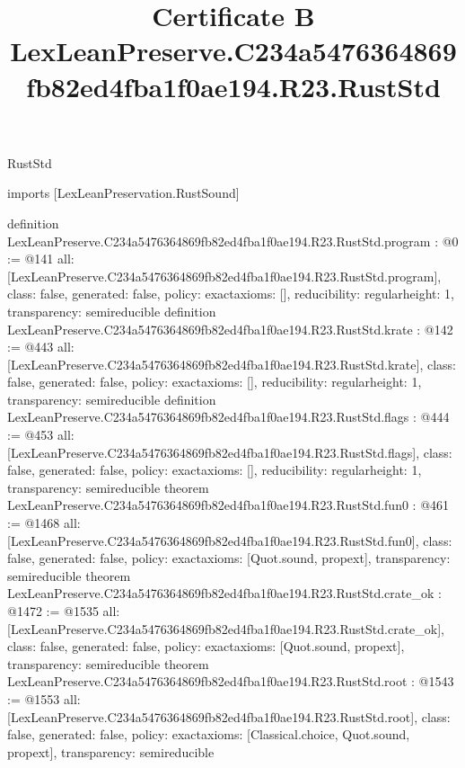 \begin{lexlean}{RustStd}
\title{Certificate B LexLeanPreserve.C234a5476364869fb82ed4fba1f0ae194.R23.RustStd}
\begin{coremodule}
imports [LexLeanPreservation.RustSound]

definition LexLeanPreserve.C234a5476364869fb82ed4fba1f0ae194.R23.RustStd.program : @0 := @141 {
  all: [LexLeanPreserve.C234a5476364869fb82ed4fba1f0ae194.R23.RustStd.program],
  class: false,
  generated: false,
  policy: exact{axioms: []},
  reducibility: regular{height: 1},
  transparency: semireducible
}
definition LexLeanPreserve.C234a5476364869fb82ed4fba1f0ae194.R23.RustStd.krate : @142 := @443 {
  all: [LexLeanPreserve.C234a5476364869fb82ed4fba1f0ae194.R23.RustStd.krate],
  class: false,
  generated: false,
  policy: exact{axioms: []},
  reducibility: regular{height: 1},
  transparency: semireducible
}
definition LexLeanPreserve.C234a5476364869fb82ed4fba1f0ae194.R23.RustStd.flags : @444 := @453 {
  all: [LexLeanPreserve.C234a5476364869fb82ed4fba1f0ae194.R23.RustStd.flags],
  class: false,
  generated: false,
  policy: exact{axioms: []},
  reducibility: regular{height: 1},
  transparency: semireducible
}
theorem LexLeanPreserve.C234a5476364869fb82ed4fba1f0ae194.R23.RustStd.fun0 : @461 := @1468 {
  all: [LexLeanPreserve.C234a5476364869fb82ed4fba1f0ae194.R23.RustStd.fun0],
  class: false,
  generated: false,
  policy: exact{axioms: [Quot.sound, propext]},
  transparency: semireducible
}
theorem LexLeanPreserve.C234a5476364869fb82ed4fba1f0ae194.R23.RustStd.crate_ok : @1472 := @1535 {
  all: [LexLeanPreserve.C234a5476364869fb82ed4fba1f0ae194.R23.RustStd.crate_ok],
  class: false,
  generated: false,
  policy: exact{axioms: [Quot.sound, propext]},
  transparency: semireducible
}
theorem LexLeanPreserve.C234a5476364869fb82ed4fba1f0ae194.R23.RustStd.root : @1543 := @1553 {
  all: [LexLeanPreserve.C234a5476364869fb82ed4fba1f0ae194.R23.RustStd.root],
  class: false,
  generated: false,
  policy: exact{axioms: [Classical.choice, Quot.sound, propext]},
  transparency: semireducible
}


\end{coremodule}
\end{lexlean}
